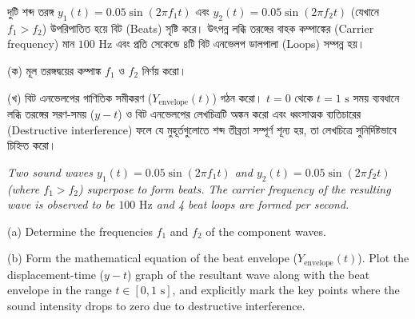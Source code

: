 \documentclass[12pt, a4paper]{article}
\begin{document}
\begin{tcolorbox}[questionbox={প্রশ্ন (Question) 9}]
\noindent
দুটি শব্দ তরঙ্গ $y_1(t) = 0.05 \sin(2\pi f_1 t)$ এবং $y_2(t) = 0.05 \sin(2\pi f_2 t)$ (যেখানে $f_1 > f_2$) উপরিপাতিত হয়ে বিট (Beats) সৃষ্টি করে। উৎপন্ন লব্ধি তরঙ্গের বাহক কম্পাঙ্কের (Carrier frequency) মান $100\text{ Hz}$ এবং প্রতি সেকেন্ডে ৪টি বিট এনভেলপ ডালপালা (Loops) সম্পন্ন হয়।

\vspace{0.5em}
\noindent
(ক) মূল তরঙ্গদ্বয়ের কম্পাঙ্ক $f_1$ ও $f_2$ নির্ণয় করো।

\vspace{0.3em}
\noindent
(খ) বিট এনভেলপের গাণিতিক সমীকরণ ($Y_{\text{envelope}}(t)$) গঠন করো। $t = 0$ থেকে $t = 1\text{ s}$ সময় ব্যবধানে লব্ধি তরঙ্গের সরণ-সময় ($y-t$) ও বিট এনভেলপের লেখচিত্রটি অঙ্কন করো এবং ধ্বংসাত্মক ব্যতিচারের (Destructive interference) ফলে যে মুহূর্তগুলোতে শব্দ তীব্রতা সম্পূর্ণ শূন্য হয়, তা লেখচিত্রে সুনির্দিষ্টভাবে চিহ্নিত করো।

\vspace{0.8em}
{\color{darkgray}\itshape
\noindent
Two sound waves $y_1(t) = 0.05 \sin(2\pi f_1 t)$ and $y_2(t) = 0.05 \sin(2\pi f_2 t)$ (where $f_1 > f_2$) superpose to form beats. The carrier frequency of the resulting wave is observed to be $100\text{ Hz}$ and 4 beat loops are formed per second.

\vspace{0.3em}
\noindent
(a) Determine the frequencies $f_1$ and $f_2$ of the component waves.

\vspace{0.3em}
\noindent
(b) Form the mathematical equation of the beat envelope ($Y_{\text{envelope}}(t)$). Plot the displacement-time ($y-t$) graph of the resultant wave along with the beat envelope in the range $t \in [0, 1\text{ s}]$, and explicitly mark the key points where the sound intensity drops to zero due to destructive interference.
}
\end{tcolorbox}

\vspace{1.2em}
\end{document}
